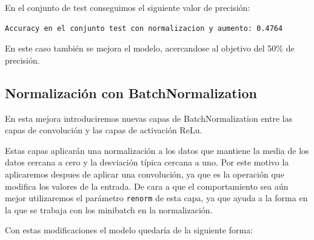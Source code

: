 \documentclass[12pt, spanish]{article}
\begin{document}
En el conjunto de test conseguimos el siguiente valor de precisión:

\begin{lstlisting}
Accuracy en el conjunto test con normalizacion y aumento: 0.4764
\end{lstlisting}

En este caso también se mejora el modelo, acercandose al objetivo del 50\% de precisión.

\subsection{Normalización con BatchNormalization}

En esta mejora introduciremos nuevas capas de BatchNormalization\cite{batchnormalization} entre las capas de convolución y las capas de activación ReLu.

Estas capas aplicarán una normalización a los datos que mantiene la media de los datos cercana a cero y la desviación típica cercana a uno. Por este motivo la aplicaremos despues de aplicar una convolución, ya que es la operación que modifica los valores de la entrada. De cara a que el comportamiento sea aún mejor utilizaremos el parámetro \texttt{renorm} de esta capa, ya que ayuda a la forma en la que se trabaja con los minibatch en la normalización\cite{renorm}.


Con estas modificaciones el modelo quedaría de la siguiente forma:
\end{document}
